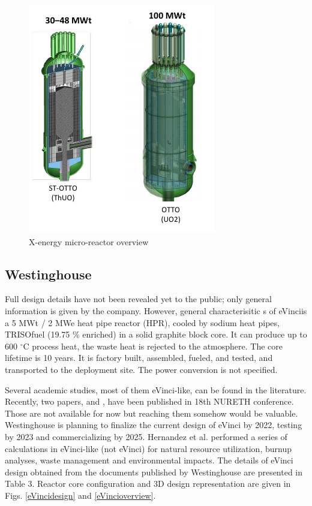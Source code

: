 \begin{figure}[hbtp]
\centering
\includegraphics[scale=0.97]{Figs/xoverview.jpeg}
\caption{X-energy micro-reactor overview}
\label{xo}
\end{figure} 

\subsection{Westinghouse}
Full design details have not been revealed yet to the public; only general information is given by the company. However, general characterisitic s of eVinciis a 5 MWt / 2 MWe heat pipe reactor (HPR), cooled by sodium heat pipes, TRISOfuel (19.75 \% enriched) in  a  solid graphite block  core. It  can  produce  up  to  600 $^\circ{}$C  process  heat, the  waste  heat  is  rejected  to  the atmosphere.  The  core lifetime is 10 years.  It  is  factory  built,  assembled,  fueled,  and  tested, and transported to  the deployment site. The power conversion is not specified.

Several academic studies, most of them eVinci-like, can be found in the literature. Recently, two papers, \cite{hong_thermal_2019} and \cite{wright_phenomena_2019}, have been published in 18th \gls{NURETH} conference. Those are not available for now but reaching them somehow would be valuable. Westinghouse is planning to finalize the current design of eVinci by 2022, testing by 2023 and commercializing by 2025. Hernandez et al. \cite{hernandez_micro_2019} performed a series of calculations in eVinci-like (not eVinci) for natural resource utilization, burnup analyses, waste management and environmental impacts. The details of eVinci design obtained from the documents published by Westinghouse are presented in Table 3. Reactor core configuration and 3D design representation are given in Figs. \ref{eVincidesign} and \ref{eVincioverview}.

